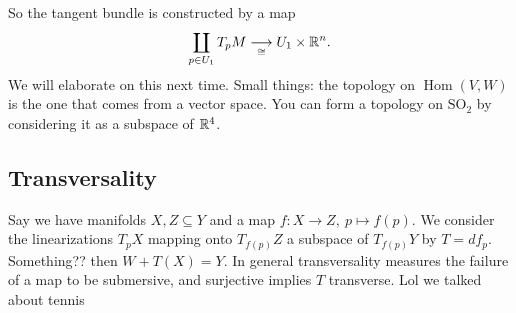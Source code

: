 \begin{figure}[H]
\centering
{}
\end{figure}So the tangent bundle is constructed by a map \[
\coprod_{p \in U_1}T_p M \underset{\cong}{\longrightarrow} U_1\times \mathbb{R}^n .
\] We will elaborate on this next time. Small things: the topology on $\operatorname{Hom}(V,W)$ is the one that comes from a vector space. You can form a topology on $\mathrm{SO}_2$ by considering it as a subspace of $\mathbb{R}^4$.

\subsection{Transversality}
Say we have manifolds $X,Z\subseteq Y$ and a map $f \colon X \to Z,\ p \mapsto f(p)$. We consider the linearizations $T_pX$ mapping onto $T_{f(p)}Z$ a subspace of $T_{f(p)}Y$ by $T=df_p$. Something?? then $W+T(X)=Y$. In general transversality measures the failure of a map to be submersive, and surjective implies $T$ transverse. Lol we talked about tennis

